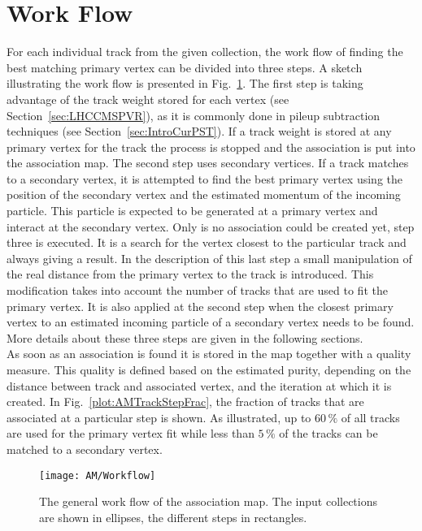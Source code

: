 \section{Work Flow \label{sec:AMWorkflow}}

For each individual track from the given collection, the work flow of finding the best matching primary vertex can be divided into three steps. A sketch illustrating the work flow is presented in Fig.~\ref{plot:AMWorkSketch}. The first step is taking advantage of the track weight stored for each vertex (see Section~\ref{sec:LHCCMSPVR}), as it is commonly done in pileup subtraction techniques (see Section~\ref{sec:IntroCurPST}). If a track weight is stored at any primary vertex for the track the process is stopped and the association is put into the association map. The second step uses secondary vertices. If a track matches to a secondary vertex, it is attempted to find the best primary vertex using the position of the secondary vertex and the estimated momentum of the incoming particle. This particle is expected to be generated at a primary vertex and interact at the secondary vertex. Only is no association could be created yet, step three is executed. It is a search for the vertex closest to the particular track and always giving a result. In the description of this last step a small manipulation of the real distance from the primary vertex to the track is introduced. This modification takes into account the number of tracks that are used to fit the primary vertex. It is also applied at the second step when the closest primary vertex to an estimated incoming particle of a secondary vertex needs to be found. More details about these three steps are given in the following sections.  \\
As soon as an association is found it is stored in the map together with a quality measure. This quality is defined based on the estimated purity, depending on the distance between track and associated vertex, and the iteration at which it is created. In Fig.~\ref{plot:AMTrackStepFrac}, the fraction of tracks that are associated at a particular step is shown. As illustrated, up to $60\,\%$ of all tracks are used for the primary vertex fit while less than $5\,\%$ of the tracks can be matched to a secondary vertex.

\begin{figure}[!ht]
    \centering
    \texttt{[image: AM/Workflow]}
    \caption[Sketch of the work flow of the association map]{The general work flow of the association map. The input collections are shown in ellipses, the different steps in rectangles. \label{plot:AMWorkSketch}}
\end{figure}

